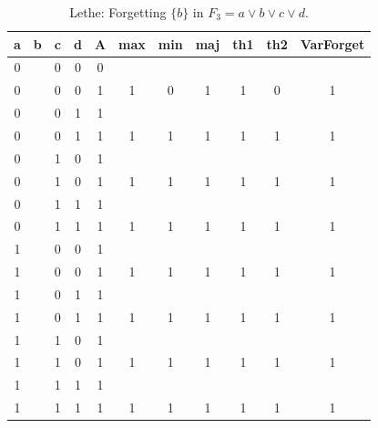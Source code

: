 \begin{table}[!tb]
    \centering
    \begin{tabular}{|c|c|c|c|c|c|c|c|c|c|c|}
        \hline
        \textbf{a} & \textbf{b} & \textbf{c} & \textbf{d} & \textbf{A} & \textbf{max} & \textbf{min} & \textbf{maj} & \textbf{th1} & \textbf{th2} & \textbf{VarForget} \\ \hline
        \rowcolor{gray!40} 0 &  & 0 & 0 & 0 &  &  &  &  &  &  \\ \hline
        \rowcolor{gray!40} 0 &  & 0 & 0 & 1 & 1 & 0 & 1 & 1 & 0 & 1 \\ \hline
        \rowcolor{blue!40} 0 &  & 0 & 1 & 1 &  &  &  &  &  &  \\ \hline
        \rowcolor{blue!40} 0 &  & 0 & 1 & 1 & 1 & 1 & 1 & 1 & 1 & 1 \\ \hline
        \rowcolor{red!40} 0 &  & 1 & 0 & 1 &  &  &  &  &  &  \\ \hline
        \rowcolor{red!40} 0 &  & 1 & 0 & 1 & 1 & 1 & 1 & 1 & 1 & 1 \\ \hline
        \rowcolor{green!40} 0 &  & 1 & 1 & 1 &  &  &  &  &  &  \\ \hline
        \rowcolor{green!40} 0 &  & 1 & 1 & 1 & 1 & 1 & 1 & 1 & 1 & 1 \\ \hline
        \rowcolor{yellow!40} 1 &  & 0 & 0 & 1 &  &  &  &  &  &  \\ \hline
        \rowcolor{yellow!40} 1 &  & 0 & 0 & 1 & 1 & 1 & 1 & 1 & 1 & 1 \\ \hline
        \rowcolor{gray!40} 1 &  & 0 & 1 & 1 &  &  &  &  &  &  \\ \hline
        \rowcolor{gray!40} 1 &  & 0 & 1 & 1 & 1 & 1 & 1 & 1 & 1 & 1 \\ \hline
        \rowcolor{blue!40} 1 &  & 1 & 0 & 1 &  &  &  &  &  &  \\ \hline
        \rowcolor{blue!40} 1 &  & 1 & 0 & 1 & 1 & 1 & 1 & 1 & 1 & 1 \\ \hline
        \rowcolor{red!40} 1 &  & 1 & 1 & 1 &  &  &  &  &  &  \\ \hline
        \rowcolor{red!40} 1 &  & 1 & 1 & 1 & 1 & 1 & 1 & 1 & 1 & 1 \\ \hline
    \end{tabular}
    \caption{Lethe: Forgetting $\{b\}$ in $F_{3} = a \lor b \lor c \lor d$.}
    \label{tab:lethe-F3-b}
\end{table}

